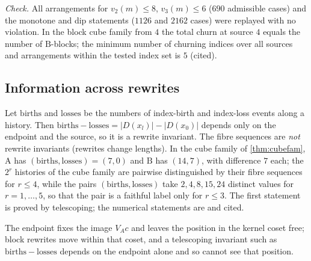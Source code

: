 \emph{Check.} All arrangements for $v_2(m)\le8$, $v_3(m)\le6$ ($690$ admissible cases) and the monotone and dip statements ($1126$ and $2162$ cases) were replayed with no violation. In the block cube family from $4$ the total churn at source $4$ equals the number of $\mathrm B$-blocks; the minimum number of churning indices over all sources and arrangements within the tested index set is $5$ (cited).

\subsection{Information across rewrites}
\begin{proposition}\label{prop:births}
Let $\mathrm{births}$ and $\mathrm{losses}$ be the numbers of index-birth and index-loss events along a history. Then $\mathrm{births}-\mathrm{losses}=|D(x_l)|-|D(x_0)|$ depends only on the endpoint and the source, so it is a rewrite invariant. The fibre sequences are \emph{not} rewrite invariants (rewrites change lengths). In the cube family of \cref{thm:cubefam}, $\mathrm A$ has $(\mathrm{births},\mathrm{losses})=(7,0)$ and $\mathrm B$ has $(14,7)$, with difference $7$ each; the $2^r$ histories of the cube family are pairwise distinguished by their fibre sequences for $r\le4$, while the pairs $(\mathrm{births},\mathrm{losses})$ take $2,4,8,15,24$ distinct values for $r=1,\dots,5$, so that the pair is a faithful label only for $r\le3$. The first statement is proved by telescoping; the numerical statements are  and cited.
\end{proposition}
The endpoint fixes the image $V_Ac$ and leaves the position in the kernel coset free; block rewrites move within that coset, and a telescoping invariant such as $\mathrm{births}-\mathrm{losses}$ depends on the endpoint alone and so cannot see that position.

